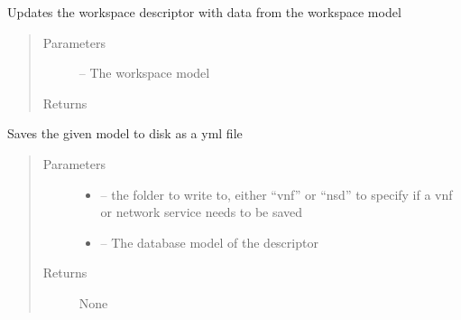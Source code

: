\documentclass[letterpaper,10pt,english]{sphinxmanual}
\begin{document}

\begin{fulllineitems}
\label{_source/son_editor.util:son_editor.util.descriptorutil.update_workspace_descriptor}
Updates the workspace descriptor with data from the workspace model
\begin{quote}\begin{description}
\item[{Parameters}] \leavevmode
{} -- The workspace model

\item[{Returns}] \leavevmode


\end{description}\end{quote}

\end{fulllineitems}


\begin{fulllineitems}
\label{_source/son_editor.util:son_editor.util.descriptorutil.write_ns_vnf_to_disk}
Saves the given model to disk as a yml file
\begin{quote}\begin{description}
\item[{Parameters}] \leavevmode\begin{itemize}
\item {} 
 -- the folder to write to, either ``vnf'' or ``nsd''
to specify if a vnf or network service needs to be saved

\item {} 
 -- The database  model of the descriptor

\end{itemize}

\item[{Returns}] \leavevmode
None

\end{description}\end{quote}

\end{fulllineitems}
\end{document}
